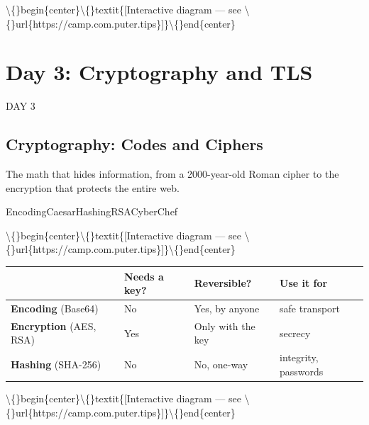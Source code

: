\documentclass[12pt,openany]{book}
\begin{document}
\textbackslash\{\}begin\{center\}\textbackslash\{\}textit\{[Interactive diagram --- see \textbackslash\{\}url\{https://camp.com.puter.tips\}]\}\textbackslash\{\}end\{center\}









\chapter{Day 3: Cryptography and TLS}
DAY 3


\section*{Cryptography: Codes and Ciphers}


The math that hides information, from a 2000-year-old Roman cipher to the encryption that protects the entire web.


EncodingCaesarHashingRSACyberChef









\textbackslash\{\}begin\{center\}\textbackslash\{\}textit\{[Interactive diagram --- see \textbackslash\{\}url\{https://camp.com.puter.tips\}]\}\textbackslash\{\}end\{center\}



\begin{center}\small\begin{tabular}{p{3.2cm}p{3.2cm}p{3.2cm}p{3.2cm}}\toprule
\textbf{} & \textbf{Needs a key?} & \textbf{Reversible?} & \textbf{Use it for} \\ \midrule
\textbf{Encoding} (Base64) & No & Yes, by anyone & safe transport \\
\textbf{Encryption} (AES, RSA) & Yes & Only with the key & secrecy \\
\textbf{Hashing} (SHA-256) & No & No, one-way & integrity, passwords \\
\bottomrule\end{tabular}\end{center}







\textbackslash\{\}begin\{center\}\textbackslash\{\}textit\{[Interactive diagram --- see \textbackslash\{\}url\{https://camp.com.puter.tips\}]\}\textbackslash\{\}end\{center\}
\end{document}
